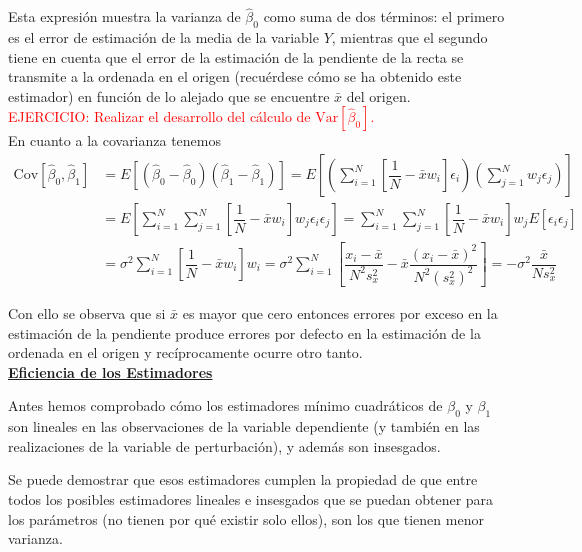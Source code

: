 \documentclass[10pt,a4paper]{book}
\begin{document}
Esta expresión muestra la varianza de $\widehat{\beta}_0$ como suma de dos términos: el primero es el error de estimación de la media de la variable $Y$, mientras que el segundo tiene en cuenta que el error de la estimación de la pendiente de la recta se transmite a la ordenada en el origen (recuérdese cómo se ha obtenido este estimador) en función de lo alejado que se encuentre $\bar{x}$ del origen.
\ \\

\textcolor{red}{EJERCICIO: Realizar el desarrollo del cálculo de $\mathrm{Var}[\widehat{\beta}_0]$.}
\ \\

En cuanto a la covarianza tenemos 
\begin{equation*}\begin{split}\mathrm{Cov}[\widehat{\beta}_0,\widehat{\beta}_1]&=E[(\widehat{\beta}_0-\widehat{\beta}_0)(\widehat{\beta}_1-\widehat{\beta}_1)]=E\left[\left(\sum^N_{i=1}\left[\dfrac{1}{N}-\bar{x}w_i\right]\epsilon_i\right)\left(\sum^N_{j=1}w_j\epsilon_j\right)\right]\\&=E\left[\sum^N_{i=1}\sum^N_{j=1}\left[\dfrac{1}{N}-\bar{x}w_i\right]w_j\epsilon_i\epsilon_j\right]=\sum^N_{i=1}\sum^N_{j=1}\left[\dfrac{1}{N}-\bar{x}w_i\right]w_jE[\epsilon_i\epsilon_j]\\&=\sigma^2\sum^N_{i=1}\left[\dfrac{1}{N}-\bar{x}w_i\right]w_i=\sigma^2\sum^N_{i=1}\left[\dfrac{x_i-\bar{x}}{N^2s^2_x}-\bar{x}\dfrac{(x_i-\bar{x})^2}{N^2(s^2_x)^2}\right]=-\sigma^2\dfrac{\bar{x}}{Ns^2_x}\end{split} 
\end{equation*}

Con ello se observa que si $\bar{x}$ es mayor que cero entonces errores por exceso en la estimación de la pendiente produce errores por defecto en la estimación de la ordenada en el origen y recíprocamente ocurre otro tanto.
\ \\

\underline{\textbf{Eficiencia de los Estimadores}}

Antes hemos comprobado cómo los estimadores mínimo cuadráticos de $\beta_0$ y $\beta_1$ son lineales en las observaciones de la variable dependiente (y también en las realizaciones de la variable de perturbación), y además son insesgados.

Se puede demostrar que esos estimadores cumplen la propiedad de que entre todos los posibles estimadores lineales e insesgados que se puedan obtener para los parámetros (no tienen por qué existir solo ellos), son los que tienen menor varianza.
\end{document}
